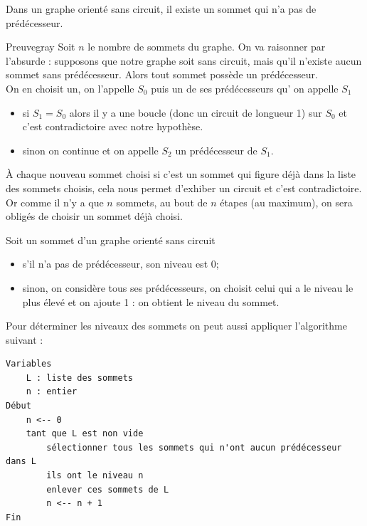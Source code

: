 \begin{propriete}[]
    Dans un graphe orienté sans circuit, il existe un sommet qui n'a pas de prédécesseur.
\end{propriete}
\begin{encadrecolore}{Preuve}{gray}
    Soit $n$ le nombre de sommets du graphe. On va raisonner par l'absurde : supposons que notre graphe soit sans circuit, mais qu'il n'existe aucun sommet sans prédécesseur. Alors tout sommet possède un prédécesseur.\\
    On en choisit un, on l'appelle  $S_0$ puis un de ses prédécesseurs qu' on appelle $S_1$
    \begin{itemize}
        \item 	si $S_1=S_0$ alors il y a une boucle (donc un circuit de longueur 1) sur $S_0$ et c'est contradictoire avec notre hypothèse.
        \item 	sinon on continue et on appelle $S_2$ un prédécesseur de $S_1$.
    \end{itemize}
    À chaque nouveau sommet choisi si c'est un sommet qui figure déjà dans la liste des sommets choisis, cela nous permet d'exhiber un circuit et c'est contradictoire. Or comme il n'y a que $n$ sommets, au bout de $n$ étapes (au maximum), on sera obligés de choisir un sommet déjà choisi.
\end{encadrecolore}


\begin{definition}
    Soit un sommet d'un graphe orienté sans circuit
    \begin{itemize}
        \item 	s'il n'a pas de prédécesseur, son niveau est 0;
        \item 	sinon, on considère tous ses prédécesseurs, on choisit celui qui a le niveau le plus élevé et on ajoute 1 : on obtient le niveau du sommet.
    \end{itemize}
\end{definition}

Pour déterminer les niveaux des sommets on peut aussi appliquer l'algorithme suivant :
\begin{verbatim}
Variables
    L : liste des sommets
    n : entier 
Début
    n <-- 0
    tant que L est non vide
        sélectionner tous les sommets qui n'ont aucun prédécesseur dans L
        ils ont le niveau n
        enlever ces sommets de L
	    n <-- n + 1
Fin
\end{verbatim}


